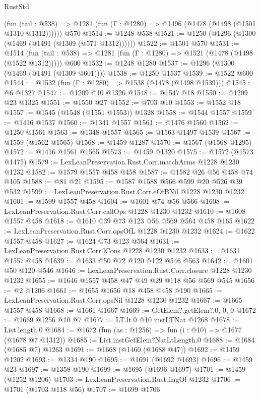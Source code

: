 \begin{lexlean}{RustStd}
\begin{coremodule}
      (fun (tail : @538) => @1281 (fun (Γ : @1280) => @1496 (@1478 (@1498 (@1501 @1310 @1312))))))
    @570
@1514 := @1248 @538
@1521 := @1250 (@1296 (@1300 (@1469 (@1491 (@1309 (@571 @1312))))))
@1522 := @1501 @570
@1531 := @1514
    (fun (tail : @538) => @1281 (fun (Γ : @1280) => @1521 (@1478 (@1498 (@1522 @1312)))))
    @600
@1532 := @1248 @1280
@1537 := @1296 (@1300 (@1469 (@1491 (@1309 @601))))
@1538 := @1250 @1537
@1539 := @1522 @600
@1544 := @1532 (fun (Γ : @1280) => @1538 (@1478 (@1498 @1539)))
@1545 := @6 @1327
@1547 := @1209 @10 @1326
@1548 := @1547 @18
@1550 := @1209 @23 @1325
@1551 := @1550 @27
@1552 := @703 @10
@1553 := @1552 @18
@1557 := @1545 (@1548 (@1551 @1553)) @1328
@1558 := @1544 @1557
@1559 := @1416 @1537
@1560 := @1341 @1557
@1561 := @1476 @1560
@1562 := @1250 @1561
@1563 := @1348 @1557
@1565 := @1563 @1497 @1539
@1567 := @1559 (@1562 @1565)
@1568 := @1459 @1287
@1570 := @1567 (@1568 @1295)
@1572 := @1416 @1561 @1565
@1573 := @1459 @1320
@1575 := @1572 (@1573 @1475)
@1579 := LexLeanPreservation.Rust.Corr.matchArms @1228 @1230 @1232
@1582 := @1579 @1557 @458 @458
@1587 := @1582 @26 @56 @458 @74 @105
@1588 := @81 @21
@1595 := @1587 @1588 @566 @599 @20 @526 @39 @532
@1599 := LexLeanPreservation.Rust.Corr.eOfBNil @1228 @1230 @1232
@1601 := @1599 @1557 @458
@1604 := @1601 @74 @56 @566
@1608 := LexLeanPreservation.Rust.Corr.callOps @1228 @1230 @1232
@1610 := @1608 @1557 @458
@1618 := @1610 @39 @73 @123 @56 @569 @564 @458 @165
@1622 := LexLeanPreservation.Rust.Corr.opsOfL @1228 @1230 @1232
@1624 := @1622 @1557 @458
@1627 := @1624 @73 @123 @564
@1631 := LexLeanPreservation.Rust.Corr.lCons @1228 @1230 @1232
@1633 := @1631 @1557 @458
@1639 := @1633 @50 @72 @120 @122 @546 @563
@1642 := @1601 @50 @120 @546
@1646 := LexLeanPreservation.Rust.Corr.closure @1228 @1230 @1232
@1655 := @1646 @1557 @458 @47 @49 @29 @118 @56 @569 @545
@1656 := @2 @1206
@1661 := @1655 @1656 @18 @458 @458 @190
@1665 := LexLeanPreservation.Rust.Corr.opsNil @1228 @1230 @1232
@1667 := @1665 @1557 @458
@1668 := @1661 @1667
@1669 := GetElem?.getElem?.{0, 0, 0}
@1672 := @1669 @1256 @10 @7
@1677 := LT.lt.{0} @10 instLTNat @1268
@1678 := List.length.{0}
@1684 := @1672 (fun (as : @1256) => fun (i : @10) => @1677 (@1678 @7 @1312))
@1685 := List.instGetElem?NatLtLength.{0}
@1688 := @1684 (@1685 @7) @1263
@1691 := @1668 (@1460 (@1688 @47))
@1692 := @1459 @1202
@1693 := @1334 @190
@1695 := @1691 (@1692 @1693)
@1696 := @1459 @23
@1697 := @1358 @190
@1699 := @1695 (@1696 @1697)
@1701 := @1459 (@1252 @1206)
@1703 := LexLeanPreservation.Rust.flagOf @1232
@1706 := @1701 (@1703 @118 @56)
@1707 := @1699 @1706

\end{coremodule}
\end{lexlean}
